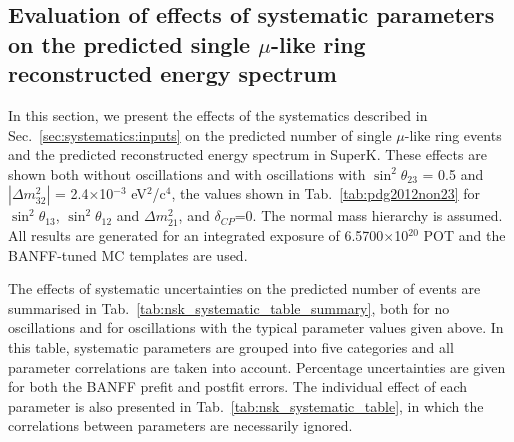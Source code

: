 
%
%
%
%
%


\subsection {Evaluation of effects of systematic parameters on the predicted single $\mu$-like ring reconstructed energy spectrum}
\label{sec:systematics:evaluation}

In this section, we present the effects of the systematics described in Sec.\ \ref{sec:systematics:inputs}
on the predicted number of single $\mu$-like ring events and the predicted reconstructed energy spectrum in SuperK.
These effects are shown both without oscillations and with oscillations with
$\sin^{2}\theta_{23}$ = 0.5 and $|\Delta m^{2}_{32}|$ = 2.4$\times$10$^{-3}$ eV$^{2}$/c$^{4}$, the values shown in Tab.\
\ref{tab:pdg2012non23} for $\sin^{2}\theta_{13}$, $\sin^{2}\theta_{12}$ and $\Delta m^{2}_{21}$,
and $\delta_{CP}$=0. The normal mass hierarchy is assumed.
All results are generated for an integrated exposure of 6.5700$\times$10$^{20}$ POT and
the BANFF-tuned MC templates are used.

The effects of systematic uncertainties on the predicted number of events are summarised in Tab.\ \ref{tab:nsk_systematic_table_summary}, 
both for no oscillations and for oscillations with the typical parameter values given above.
In this table, systematic parameters are grouped into five categories and all parameter correlations are taken into account.
Percentage uncertainties are given for both the BANFF prefit and postfit errors.
The individual effect of each parameter is also presented in Tab.\ \ref{tab:nsk_systematic_table}, in which the correlations
between parameters are necessarily ignored.

